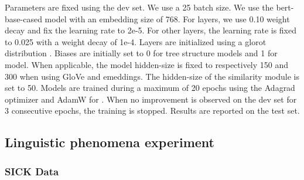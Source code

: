 Parameters are fixed using the dev set. We use a 25 batch size. We use the bert-base-cased model \parencite{wolf_2019} with an embedding size of 768. For \bert layers, we use 0.10 weight decay and fix the learning rate to 2e-5. For other layers, the learning rate is fixed to 0.025 with a weight decay of 1e-4. Layers are initialized using a glorot distribution \parencite{glorot_10} . Biases are initially set to 0 for tree structure models and 1 for \seq model. When applicable, the model hidden-size is fixed to respectively 150 and 300 when using GloVe and \bert emeddings. The hidden-size of the similarity module is set to 50. Models are trained during a maximum of 20 epochs using the Adagrad optimizer \parencite{duchi_11} and AdamW for \bert \parencite{loshchilov_19}. When no improvement is observed on the dev set for 3 consecutive epochs, the training is stopped. Results are reported on the test set. 
% 
\subsection{Linguistic phenomena experiment}
\label{sec:linguistic-breakdown}


\subsubsection{SICK Data} 

